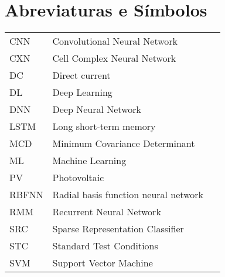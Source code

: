 \chapter*{Abreviaturas e Símbolos}

\begin{flushleft}
\begin{tabular}{l p{0.8\linewidth}}
CNN        & Convolutional Neural Network \\
CXN       & Cell Complex Neural Network \\
DC      & Direct current \\
DL      & Deep Learning \\
DNN      & Deep Neural Network \\
LSTM      & Long short-term memory \\
MCD      & Minimum Covariance Determinant\\
ML          & Machine Learning \\
PV      & Photovoltaic \\
RBFNN   & Radial basis function neural network \\
RMM     & Recurrent Neural Network \\
SRC     & Sparse Representation Classifier \\
STC      & Standard Test Conditions \\
SVM         & Support Vector Machine
\end{tabular}
\end{flushleft}

